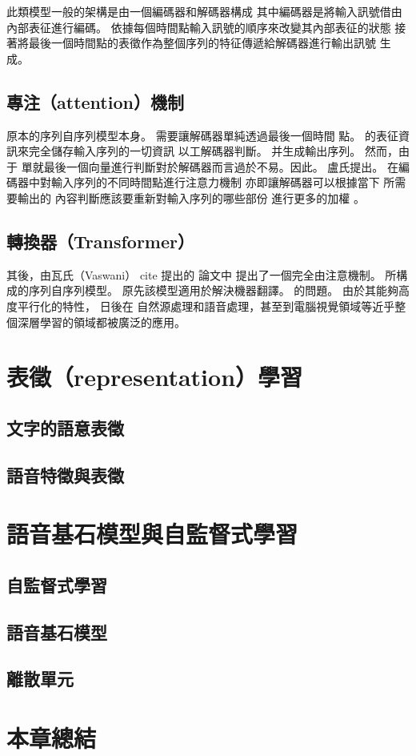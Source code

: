 此類模型一般的架構是由一個編碼器和解碼器構成 其中編碼器是將輸入訊號借由內部表征進行編碼。 依據每個時間點輸入訊號的順序來改變其內部表征的狀態 接著將最後一個時間點的表徵作為整個序列的特征傳遞給解碼器進行輸出訊號 生成。 
    
\subsection{專注（attention）機制}
    
    原本的序列自序列模型本身。 需要讓解碼器單純透過最後一個時間 點。 的表征資訊來完全儲存輸入序列的一切資訊 以工解碼器判斷。 并生成輸出序列。 然而，由于 單就最後一個向量進行判斷對於解碼器而言過於不易。因此。 盧氏提出。 在編碼器中對輸入序列的不同時間點進行注意力機制 亦即讓解碼器可以根據當下 所需要輸出的 內容判斷應該要重新對輸入序列的哪些部份 進行更多的加權 。

    

\subsection{轉換器（Transformer）}

其後，由瓦氏（Vaswani） cite 提出的 論文中 提出了一個完全由注意機制。 所構成的序列自序列模型。 原先該模型適用於解決機器翻譯。 的問題。
由於其能夠高度平行化的特性， 日後在 自然源處理和語音處理，甚至到電腦視覺領域等近乎整個深層學習的領域都被廣泛的應用。  


\section{表徵（representation）學習}

\subsection{文字的語意表徵}



\subsection{語音特徵與表徵}


\section{語音基石模型與自監督式學習}

\subsection{自監督式學習}

\subsection{語音基石模型}

\subsection{離散單元}


\section{本章總結}


